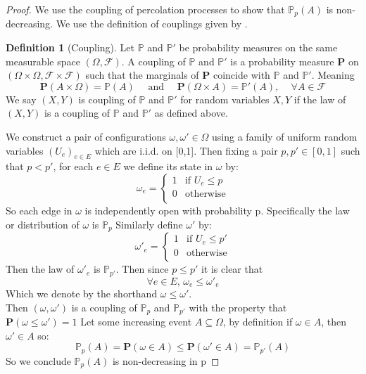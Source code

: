 \documentclass[a4paper,11pt]{article}
\theoremstyle{definition}
\newtheorem{definition}[theorem]{Definition}
\newcommand{\prob}{\mathbb{P}_p}
\begin{document}
\begin{proof}
	We use the coupling of percolation processes to show that $\prob(A)$ is non-decreasing. We use the definition of couplings given by \cite{roch2015modern}.

	\begin{definition}[Coupling]
		Let $\mathbb{P}$ and $\mathbb{P}'$ be probability measures on the same measurable space $(\Omega,\mathcal{F})$.
		A coupling of $\mathbb{P}$ and $\mathbb{P}'$ is a probability measure $\mathbf{P}$ on $(\Omega\times\Omega,\mathcal{F}\times \mathcal{F})$ such that the marginals of $\mathbf{P}$ coincide with $\mathbb{P}$ and $\mathbb{P}'$.
		Meaning 
		$$\mathbf{P}(A \times \Omega) = \mathbb{P}(A) \quad \text{  and  } \quad \mathbf{P}(\Omega \times A) = \mathbb{P}'(A) \text{, }\quad \forall A \in \mathcal{F}$$
		We say $(X,Y)$ is coupling of $\mathbb{P}$ and $\mathbb{P}'$ for random variables $X,Y$ if the law of $(X,Y)$ is a coupling of $\mathbb{P}$ and $\mathbb{P}'$ as defined above.
	
	\end{definition}

	We construct a pair of configurations $\omega, \omega' \in \Omega$ using a family of uniform random variables $(U_e)_{e\in E}$ which are i.i.d. on [0,1].
	Then fixing a pair $p,p' \in [0,1]$ such that $p < p'$, for each $e \in E$ we define its state in $\omega$ by:
	$$\omega_e = \begin{cases}
		1 & \text{if }U_e \leq p\\
		0 & \text{otherwise}\\
	\end{cases} $$
	So each edge in $\omega$ is independently open with probability p. Specifically the law or distribution of $\omega$ is $\prob$ 
	  Similarly define $\omega'$ by:
	$$\omega'_e = \begin{cases}
		1 & \text{if }U_e \leq p'\\
		0 & \text{otherwise}\\
	\end{cases} $$
	Then the law of $\omega'_e$ is $\mathbb{P}_{p'}$. Then since $p \leq p'$ it is clear that
	$$\forall e \in E \text{, }\omega_e \leq \omega'_e $$
	Which we denote by the shorthand $\omega \leq \omega'$.\\
	Then $(\omega,\omega')$ is a coupling of $\mathbb{P}_{p}$ and $\mathbb{P}_{p'}$ with the property that $\mathbf{P}(\omega \leq \omega') = 1$
	Let some increasing event $A \subseteq \Omega$, by definition if $\omega \in A$, then $\omega' \in A$ so:
	$$\mathbb{P}_p(A) = \mathbf{P}(\omega \in A) \leq \mathbf{P}(\omega' \in A) = \mathbb{P}_{p'}(A)$$
	So we conclude $\prob(A)$ is non-decreasing in p

\end{proof}
\end{document}
